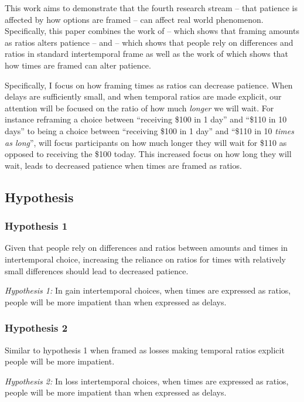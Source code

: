 \documentclass[]{article}
\begin{document}
 
This work aims to demonstrate that the fourth research stream -- that patience is affected by how options are framed -- can affect real world phenomenon.
Specifically, this paper combines the work of  -- which shows that framing amounts as ratios alters patience -- and  -- which shows that people rely on differences and ratios in standard intertemporal frame as well as the work  of   which shows that how times are framed can alter patience. 

Specifically, I focus on how framing times as ratios can decrease patience.
When delays are sufficiently small, and when temporal ratios are made explicit, our attention will be focused on the ratio of how much \textit{longer} we will wait. 
For instance reframing a choice between ``receiving \$100  in 1 day'' and ``\$110 in 10 days'' to being a choice between ``receiving \$100  in 1 day'' and ``\$110 in 10 \textit{times as long}'', will focus participants on how much longer they will wait for \$110 as opposed to receiving the \$100 today.
This increased focus on how long they will wait, leads to decreased patience when times are framed as ratios.

\subsection{Hypothesis}

\subsubsection{Hypothesis 1}
Given that people rely on differences and ratios between amounts and times in intertemporal choice, increasing the reliance on ratios for times with relatively small differences should lead to decreased patience.

\textit{Hypothesis 1:} In gain intertemporal choices, when times are expressed as ratios, people will be more impatient than when expressed as delays. 

\subsubsection{Hypothesis 2}
Similar to hypothesis 1 when framed as losses making temporal ratios explicit people will be more impatient. 

\textit{Hypothesis 2:} In loss intertemporal choices, when times are expressed as ratios, people will be more impatient than when expressed as delays. 
\end{document}
